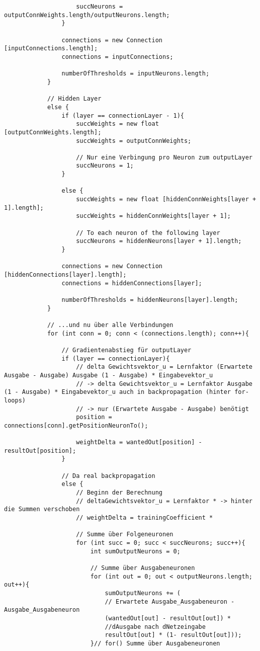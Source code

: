\begin{lstlisting}
					succNeurons = outputConnWeights.length/outputNeurons.length;
				}

				connections = new Connection [inputConnections.length];
				connections = inputConnections;
				
				numberOfThresholds = inputNeurons.length;
			}
			
			// Hidden Layer
			else {
				if (layer == connectionLayer - 1){
					succWeights = new float [outputConnWeights.length];
					succWeights = outputConnWeights;
					
					// Nur eine Verbingung pro Neuron zum outputLayer
					succNeurons = 1;
				}

				else {
					succWeights = new float [hiddenConnWeights[layer + 1].length];
					succWeights = hiddenConnWeights[layer + 1];
				
					// To each neuron of the following layer
					succNeurons = hiddenNeurons[layer + 1].length;
				}
				
				connections = new Connection [hiddenConnections[layer].length];
				connections = hiddenConnections[layer];
				
				numberOfThresholds = hiddenNeurons[layer].length;
			}
			
			// ...und nu über alle Verbindungen
			for (int conn = 0; conn < (connections.length); conn++){
				
				// Gradientenabstieg für outputLayer
				if (layer == connectionLayer){
					// delta Gewichtsvektor_u = Lernfaktor (Erwartete Ausgabe - Ausgabe) Ausgabe (1 - Ausgabe) * Eingabevektor_u
					// -> delta Gewichtsvektor_u = Lernfaktor Ausgabe (1 - Ausgabe) * Eingabevektor_u auch in backpropagation (hinter for-loops)
					// -> nur (Erwartete Ausgabe - Ausgabe) benötigt
					position = connections[conn].getPositionNeuronTo();
					
					weightDelta = wantedOut[position] - resultOut[position];
				}
				
				// Da real backpropagation
				else {
					// Beginn der Berechnung
					// deltaGewichtsvektor_u = Lernfaktor * -> hinter die Summen verschoben
					// weightDelta = trainingCoefficient * 
				  
					// Summe über Folgeneuronen
					for (int succ = 0; succ < succNeurons; succ++){
						int sumOutputNeurons = 0;
						
						// Summe über Ausgabeneuronen
						for (int out = 0; out < outputNeurons.length; out++){
							sumOutputNeurons += (
							// Erwartete Ausgabe_Ausgabeneuron - Ausgabe_Ausgabeneuron
							(wantedOut[out] - resultOut[out]) *
							//dAusgabe nach dNetzeingabe
							resultOut[out] * (1- resultOut[out]));
						}// for() Summe über Ausgabeneuronen
				

\end{lstlisting}
